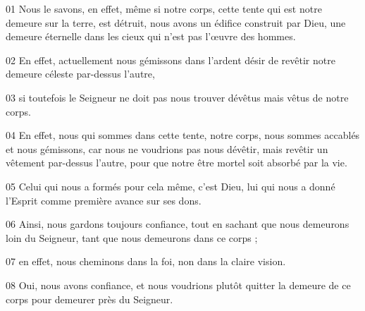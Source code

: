 01 Nous le savons, en effet, même si notre corps, cette tente qui est notre demeure sur la terre, est détruit, nous avons un édifice construit par Dieu, une demeure éternelle dans les cieux qui n’est pas l’œuvre des hommes.

02 En effet, actuellement nous gémissons dans l’ardent désir de revêtir notre demeure céleste par-dessus l’autre,

03 si toutefois le Seigneur ne doit pas nous trouver dévêtus mais vêtus de notre corps.

04 En effet, nous qui sommes dans cette tente, notre corps, nous sommes accablés et nous gémissons, car nous ne voudrions pas nous dévêtir, mais revêtir un vêtement par-dessus l’autre, pour que notre être mortel soit absorbé par la vie.

05 Celui qui nous a formés pour cela même, c’est Dieu, lui qui nous a donné l’Esprit comme première avance sur ses dons.

06 Ainsi, nous gardons toujours confiance, tout en sachant que nous demeurons loin du Seigneur, tant que nous demeurons dans ce corps ;

07 en effet, nous cheminons dans la foi, non dans la claire vision.

08 Oui, nous avons confiance, et nous voudrions plutôt quitter la demeure de ce corps pour demeurer près du Seigneur.